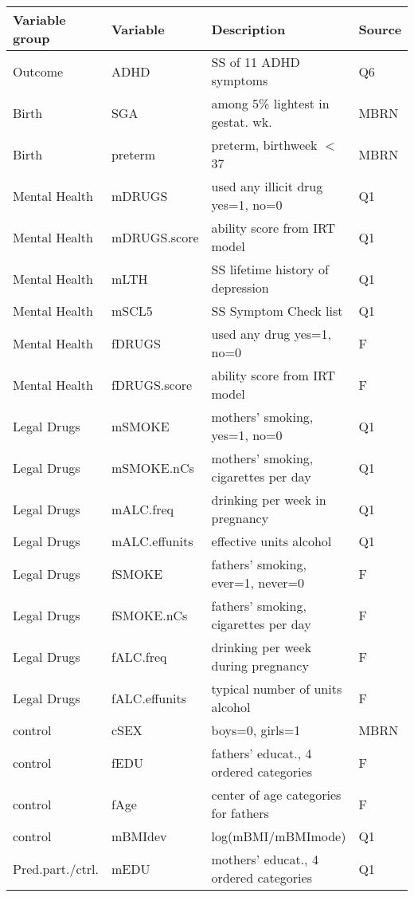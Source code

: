 \begin{table}[ph!]
	
\centering
\begin{tabular}{llll}
  \hline
  Variable group & Variable & Description & Source \\ 
  \hline
  Outcome & ADHD & SS of 11 ADHD symptoms & Q6 \\ 
  Birth & SGA & among 5\% lightest in gestat. wk. & MBRN \\ 
  Birth & preterm & preterm, birthweek $<$ 37 & MBRN \\
  Mental Health & mDRUGS & used any illicit drug yes=1, no=0 & Q1 \\ 
  Mental Health & mDRUGS.score & ability score from IRT model & Q1 \\ 
  Mental Health & mLTH & SS lifetime history of depression & Q1 \\ 
  Mental Health & mSCL5 & SS Symptom Check list & Q1 \\ 
  Mental Health & fDRUGS & used any drug yes=1, no=0 & F \\ 
  Mental Health & fDRUGS.score & ability score from IRT model & F \\ 
  Legal Drugs & mSMOKE & mothers' smoking, yes=1, no=0  & Q1 \\ 
  Legal Drugs & mSMOKE.nCs & mothers' smoking, cigarettes per day & Q1 \\
  Legal Drugs & mALC.freq & drinking per week in pregnancy & Q1 \\ 
  Legal Drugs & mALC.effunits & effective units alcohol & Q1 \\
  Legal Drugs & fSMOKE & fathers' smoking, ever=1, never=0 &  F \\ 
  Legal Drugs & fSMOKE.nCs & fathers' smoking, cigarettes per day &  F \\ 
  Legal Drugs & fALC.freq & drinking per week during pregnancy &  F \\   
  Legal Drugs & fALC.effunits & typical number of units alcohol &  F \\ 
  control & cSEX & boys=0, girls=1 & MBRN \\ 
  control & fEDU & fathers' educat., 4 ordered categories & F \\ 
  control & fAge & center of age categories for fathers & F \\ 
  control & mBMIdev & log(mBMI/mBMImode) & Q1 \\ 
  Pred.part./ctrl. & mEDU & mothers' educat., 4 ordered categories & Q1 \\ 

\end{tabular}
\end{table}
